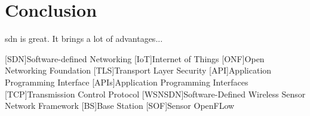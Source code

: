 \documentclass[conference]{IEEEtran}
\begin{document}
	\cite{doi:10.1155/2014/735142} \cite{Katta2016-tr} \cite{Jazaeri2023-bu} \cite{10.1007/s10586-023-04023-9} \cite{Ruggeri2021-qs}

	\section{Conclusion}
	\label{section:conclusion}

	\ac{sdn} is great. It brings a lot of advantages...

	\printbibliography
	\begin{acronym}
		[SDN]{Software-defined Networking}
		[IoT]{Internet of Things}
		[ONF]{Open Networking Foundation}
		[TLS]{Transport Layer Security}
		[API]{Application Programming Interface}
		{Application Programming Interfaces}
		[TCP]{Transmission Control Protocol}
		[WSNSDN]{Software-Defined Wireless Sensor Network Framework }
		[BS]{Base Station}
		[SOF]{Sensor OpenFLow}
	\end{acronym}

\end{document}

